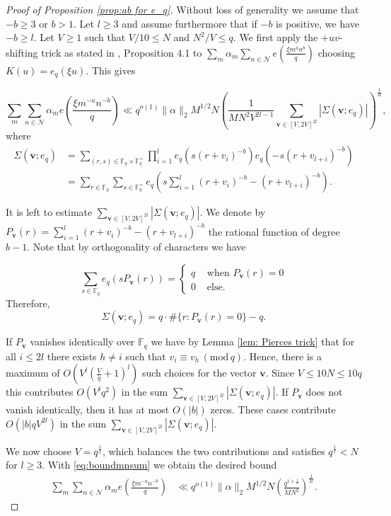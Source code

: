 \documentclass[12pt]{amsart}
\theoremstyle{plain}
\theoremstyle{definition}
\theoremstyle{remark}
\numberwithin{equation}{section}
\newcommand{\FF}{\mathbb{F}}
\newcommand{\mods}[1]{\,(\mathrm{mod}\,{#1})}
\renewcommand{\geq}{\geqslant}
\renewcommand{\leq}{\leqslant}
\begin{document}
\begin{proof}[Proof of Proposition \ref{prop:ab for e_q}]

Without loss of generality we assume that $-b\geq 3$ or $b>1$. Let $l\geq 3$ and assume furthermore that if $-b$ is positive, we have $-b\geq l$. 
Let $V\geq 1$ such that $ V/10\leq N$ and $N^2/V\leq q.$ We first apply the $+uv$-shifting trick as stated in \cite{FKMSbilinear}, Proposition 4.1 to $\sum_{m}\alpha_m\sum_{n\in \mathcal N}e\left(\frac{ \xi m^{a}n^{b}}q\right)$ choosing $K(u)=e_q( \xi u) $. This gives


\begin{equation}\label{eq:boundmnsum}
    \sum_{m}\sum_{n\in \mathcal{N}}\alpha_m e\left(\frac{\xi m^{-a}n^{-b}}q\right) \ll q^{o(1)}\|\alpha\|_2 M^{1/2}N\left(\frac{1}{MN^2V^{2l-1}}\sum_{\mathbf{v}\in[V,2V]^{2l}}|\Sigma(\mathbf{v};e_q)|\right)^{\frac1{2l}},
\end{equation}
where 
\begin{align*}
    \Sigma(\mathbf{v};e_q)&=\sum_{(r,s)\in \FF_q\times\FF_q^\times}\prod_{i=1}^le_q\left(s(r+v_i)^{-b}\right)e_q\left(-s(r+v_{l+i})^{-b}\right) \\
     &=\sum_{r\in \FF_q}\sum_{s\in \FF_q^\times}e_q\left(s\sum_{i=1}^l(r+v_i)^{-b}-(r+v_{l+i})^{-b}\right).
\end{align*}

It is left to estimate $\sum_{\mathbf{v}\in[V,2V]^{2l}}|\Sigma(\mathbf{v};e_q)|$.
We denote by $P_\mathbf{v}(r)=\sum_{i=1}^l(r+v_i)^{-b}-(r+v_{l+i})^{-b}$ the rational function of degree $b-1$. Note that by orthogonality of characters we have 

$$\sum_{s\in \FF_q}e_q(sP_\mathbf{v}(r))=\begin{cases}
    q & \text{ when } P_\mathbf{v}(r)=0 \\
    0 & \text{ else.}
\end{cases}$$
Therefore, 
$$\Sigma(\mathbf{v};e_q)=q\cdot \#\{r : P_\mathbf{v}(r)=0\}-q.$$

If $P_\mathbf{v}$ vanishes identically over $\FF_q$ we have by Lemma \ref{lem: Pierces trick} that for all $i\leq 2l$ there exists $h\neq i$ such that $v_i\equiv  v_h\mods q$. Hence, there is a maximum of $O\left(V^l\left(\frac Vq+1\right)^l\right)$ such choices for the vector $\mathbf{v}$.
Since $V\leq 10N\leq 10q$ this contributes $O(V^lq^2)$ in the sum $\sum_{\mathbf{v}\in[V,2V]^{2l}}|\Sigma(\mathbf{v};e_q)|$.
If $P_\mathbf{v}$ does not vanish identically, then it has at most $O(\vert  b\vert )$ zeros. These cases contribute $O( \vert b\vert  qV^{2l})$ in the sum $\sum_{\mathbf{v}\in[V,2V]^{2l}}|\Sigma(\mathbf{v};e_q)|$. 

We now choose $V=q^{\frac{1}{l}}$, which balances the two contributions and satisfies $q^{\frac{1}{l}}<N$ for $l\geq 3$. With \eqref{eq:boundmnsum} we obtain the desired bound
\begin{align*}
\sum_{m}\sum_{n\in \mathcal{N}}\alpha_me\left(\frac{\xi m^{-a}n^{-b}}q\right) &\ll q^{o(1)}\|\alpha\|_2M^{1/2}N\left(\frac{q^{1+\frac{1}{l}}}{MN^2}\right)^{\frac1{2l}}. 
 \end{align*} 

 
\end{proof}
\end{document}
